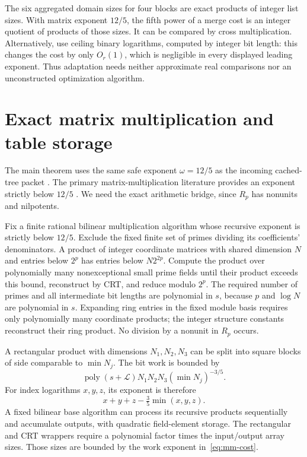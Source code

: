 \documentclass[11pt,letterpaper]{article}
\theoremstyle{remark}\newtheorem{remark}[theorem]{Remark}
\newcommand{\poly}{\operatorname{poly}}
\begin{document}
The six aggregated domain sizes for four blocks are exact products of
integer list sizes. With matrix exponent $12/5$, the fifth power of a
merge cost is an integer quotient of products of those sizes. It can be
compared by cross multiplication. Alternatively, use ceiling binary
logarithms, computed by integer bit length: this changes the cost by only
$O_r(1)$, which is negligible in every displayed leading exponent. Thus
adaptation needs neither approximate real comparisons nor an unconstructed
optimization algorithm.

\section{Exact matrix multiplication and table storage}
\label{sec:mm}

The main theorem uses the same safe exponent $\omega=12/5$ as the incoming
cached-tree packet \cite{tree}. The primary matrix-multiplication literature
provides an exponent strictly below $12/5$ \cite{mm}. We need the exact
arithmetic bridge, since $R_p$ has nonunits and nilpotents.

Fix a finite rational bilinear multiplication algorithm whose recursive
exponent is strictly below $12/5$. Exclude the fixed finite set of primes
dividing its coefficients' denominators. A product of integer coordinate
matrices with shared dimension $N$ and entries below $2^p$ has entries
below $N2^{2p}$. Compute the product over polynomially many nonexceptional
small prime fields until their product exceeds this bound, reconstruct by
CRT, and reduce modulo $2^p$. The required number of primes and all
intermediate bit lengths are polynomial in $s$, because $p$ and $\log N$
are polynomial in $s$. Expanding ring entries in the fixed module basis
requires only polynomially many coordinate products; the integer structure
constants reconstruct their ring product. No division by a nonunit in
$R_p$ occurs.

A rectangular product with dimensions $N_1,N_2,N_3$ can be split into
square blocks of side comparable to $\min N_j$. The bit work is bounded by
\[
 \poly(s+\mathcal L)
 N_1N_2N_3(\min N_j)^{-3/5}.
\]
For index logarithms $x,y,z$, its exponent is therefore
\begin{equation}\label{eq:mm-cost}
 x+y+z-\tfrac35\min(x,y,z).
\end{equation}
A fixed bilinear base algorithm can process its recursive products
sequentially and accumulate outputs, with quadratic field-element storage.
The rectangular and CRT wrappers require a polynomial factor times the
input/output array sizes. Those sizes are bounded by the work exponent
in~\eqref{eq:mm-cost}.
\end{document}
